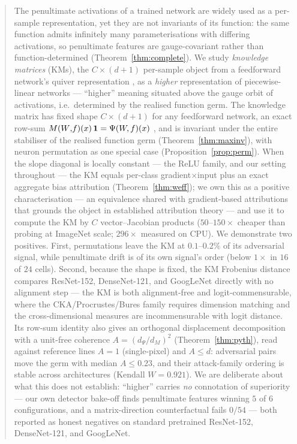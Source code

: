 \begin{abstract}
The penultimate activations of a trained network are widely used as a
per-sample representation, yet they are not invariants of its function:
the same function admits infinitely many parameterisations with
differing activations, so penultimate features are gauge-covariant
rather than function-determined (Theorem~\ref{thm:complete}).
We study \emph{knowledge matrices} (KMs), the $C\times(d{+}1)$
per-sample object from a feedforward network's quiver representation
\citep{armenta2021representation}, as a \emph{higher} representation of
piecewise-linear networks --- ``higher'' meaning situated above the
gauge orbit of activations, i.e.\ determined by the realised function
germ. The knowledge matrix has fixed shape $C\times(d{+}1)$ for any
feedforward network, an exact row-sum $\Mfx\,\mathbf 1 = \Netx$
, and is
invariant under the entire stabiliser of the realised function germ
(Theorem~\ref{thm:maxinv}), with neuron permutation as one special case
(Proposition~\ref{prop:perm}). When the slope diagonal is locally constant --- the ReLU family, and our
setting throughout --- the KM equals per-class
gradient$\times$input plus an exact aggregate bias attribution
(Theorem~\ref{thm:weff}); we own this as a positive characterisation ---
an equivalence shared with gradient-based attributions that grounds the
object in established attribution theory --- and use it to compute the
KM by $C$ vector--Jacobian products ($50$--$150\times$ cheaper than
probing at ImageNet scale; $296\times$ measured on CPU). We demonstrate
two positives. First, permutations leave the KM at $0.1$--$0.2\%$ of its
adversarial signal, while penultimate drift is of its own signal's order
(below $1\times$ in $16$ of $24$ cells). Second, because the shape is
fixed, the KM Frobenius distance compares ResNet-152, DenseNet-121, and
GoogLeNet directly with no alignment step --- the KM is both alignment-free
and logit-commensurable, where the CKA/Procrustes/Bures family requires
dimension matching and the cross-dimensional measures are incommensurable
with logit distance. Its row-sum identity also gives an
orthogonal displacement decomposition with a unit-free coherence
$A=(d_\Psi/d_M)^2$ (Theorem~\ref{thm:pyth}), read against reference lines
$A{=}1$ (single-pixel) and $A\le d$: adversarial pairs move the germ
with median $A\le0.23$, and their attack-family ordering is stable
across architectures (Kendall $W=0.921$). We are deliberate about what
this does not establish: ``higher'' carries \emph{no} connotation of
superiority --- our own detector bake-off finds penultimate features
winning $5$ of $6$ configurations, and a matrix-direction counterfactual
fails $0/54$ --- both reported as honest negatives on standard
pretrained ResNet-152, DenseNet-121, and GoogLeNet.
\end{abstract}
